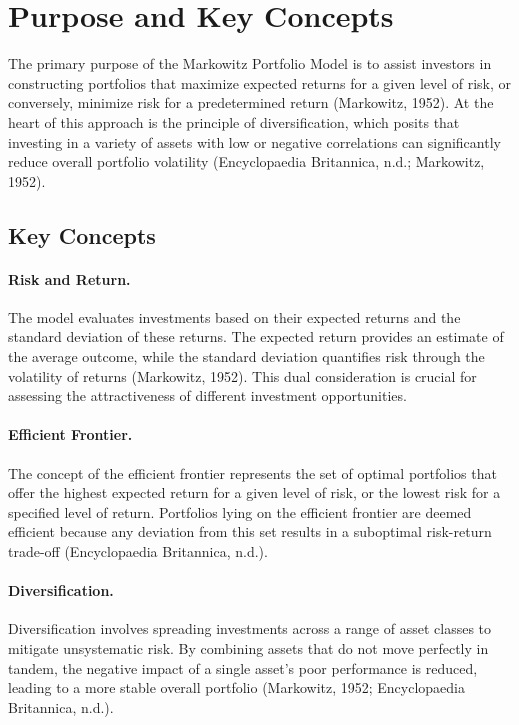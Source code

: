 \documentclass[11pt]{article}
\begin{document}
\newpage

\section{Purpose and Key Concepts}
The primary purpose of the Markowitz Portfolio Model is to assist investors in constructing portfolios that maximize expected returns for a given level of risk, or conversely, minimize risk for a predetermined return (Markowitz, 1952). At the heart of this approach is the principle of diversification, which posits that investing in a variety of assets with low or negative correlations can significantly reduce overall portfolio volatility (Encyclopaedia Britannica, n.d.; Markowitz, 1952).

\subsection*{Key Concepts}
\paragraph{Risk and Return.} The model evaluates investments based on their expected returns and the standard deviation of these returns. The expected return provides an estimate of the average outcome, while the standard deviation quantifies risk through the volatility of returns (Markowitz, 1952). This dual consideration is crucial for assessing the attractiveness of different investment opportunities.

\paragraph{Efficient Frontier.} The concept of the efficient frontier represents the set of optimal portfolios that offer the highest expected return for a given level of risk, or the lowest risk for a specified level of return. Portfolios lying on the efficient frontier are deemed efficient because any deviation from this set results in a suboptimal risk-return trade-off (Encyclopaedia Britannica, n.d.).

\paragraph{Diversification.} Diversification involves spreading investments across a range of asset classes to mitigate unsystematic risk. By combining assets that do not move perfectly in tandem, the negative impact of a single asset’s poor performance is reduced, leading to a more stable overall portfolio (Markowitz, 1952; Encyclopaedia Britannica, n.d.).
\end{document}
